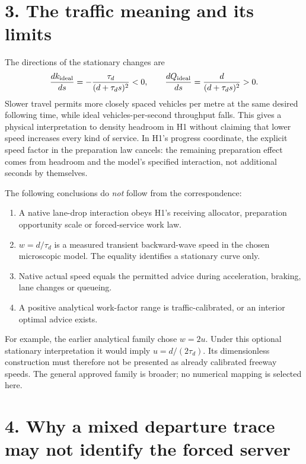 \documentclass[11pt,a4paper]{article}
\begin{document}
\newpage
\section*{3. The traffic meaning and its limits}

The directions of the stationary changes are
\begin{equation}
 \frac{d k_{\rm ideal}}{d s}
 =-\frac{\tau_d}{(d+\tau_d s)^2}<0,
 \qquad
 \frac{d Q_{\rm ideal}}{d s}
 =\frac{d}{(d+\tau_d s)^2}>0.
\end{equation}
Slower travel permits more closely spaced vehicles per metre at the same
desired following time, while ideal vehicles-per-second throughput falls.
This gives a physical interpretation to density headroom in H1 without
claiming that lower speed increases every kind of service. In H1's progress
coordinate, the explicit speed factor in the preparation law cancels:
the remaining preparation effect comes from headroom and the model's
specified interaction, not additional seconds by themselves.

The following conclusions do \emph{not} follow from the correspondence:
\begin{enumerate}
 \item A native lane-drop interaction obeys H1's receiving allocator,
 preparation opportunity scale or forced-service work law.
 \item $w=d/\tau_d$ is a measured transient backward-wave speed in the
 chosen microscopic model. The equality identifies a stationary curve only.
 \item Native actual speed equals the permitted advice during acceleration,
 braking, lane changes or queueing.
 \item A positive analytical work-factor range is traffic-calibrated, or
 an interior optimal advice exists.
\end{enumerate}
For example, the earlier analytical family chose $w=2u$. Under this optional
stationary interpretation it would imply $u=d/(2\tau_d)$. Its dimensionless
construction must therefore not be presented as already calibrated freeway
speeds. The general approved family is broader; no numerical mapping is
selected here.

\section*{4. Why a mixed departure trace may not identify the forced server}
\end{document}
